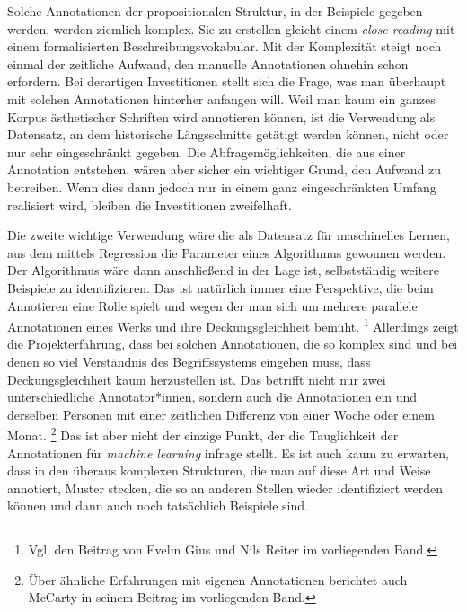 \documentclass{article}
\newcommand*{\englisch}[1]{\foreignlanguage{english}{\textit{#1}}}%
\begin{document}
Solche Annotationen der propositionalen Struktur, in der Beispiele
gegeben werden, werden ziemlich komplex. Sie zu erstellen gleicht
einem \englisch{close reading} mit einem formalisierten
Beschreibungsvokabular. Mit der Komplexität steigt noch einmal der
zeitliche Aufwand, den manuelle Annotationen ohnehin schon
erfordern. Bei derartigen Investitionen stellt sich die Frage, was man
überhaupt mit solchen Annotationen hinterher anfangen will. Weil man
kaum ein ganzes Korpus ästhetischer Schriften wird annotieren können,
ist die Verwendung als Datensatz, an dem historische Längsschnitte
getätigt werden können, nicht oder nur sehr eingeschränkt gegeben. Die
Abfragemöglichkeiten, die aus einer Annotation entstehen, wären aber
sicher ein wichtiger Grund, den Aufwand zu betreiben. Wenn dies dann
jedoch nur in einem ganz eingeschränkten Umfang realisiert wird,
bleiben die Investitionen zweifelhaft.

Die zweite wichtige Verwendung wäre die als Datensatz für maschinelles
Lernen, aus dem mittels Regression die Parameter eines Algorithmus
gewonnen werden. Der Algorithmus wäre dann anschließend in der Lage
ist, selbstständig weitere Beispiele zu identifizieren. Das ist
natürlich immer eine Perspektive, die beim Annotieren eine Rolle
spielt und wegen der man sich um mehrere parallele Annotationen eines
Werks und ihre Deckungsgleichheit bemüht.%
\footnote{Vgl. den Beitrag von Evelin Gius und Nils Reiter im
  vorliegenden Band.} %
Allerdings zeigt die Projekterfahrung, dass bei solchen Annotationen,
die so komplex sind und bei denen so viel Verständnis des
Begriffssystems eingehen muss, dass Deckungsgleichheit kaum
herzustellen ist. Das betrifft nicht nur zwei unterschiedliche
Annotator*innen, sondern auch die Annotationen ein und derselben
Personen mit einer zeitlichen Differenz von einer Woche oder einem
Monat.%
\footnote{Über ähnliche Erfahrungen mit eigenen Annotationen berichtet
  auch McCarty in seinem Beitrag im vorliegenden Band.} %
Das ist aber nicht der einzige Punkt, der die Tauglichkeit der
Annotationen für \englisch{machine learning} infrage stellt. Es ist
auch kaum zu erwarten, dass in den überaus komplexen Strukturen, die
man auf diese Art und Weise annotiert, Muster stecken, die so an
anderen Stellen wieder identifiziert werden können und dann auch noch
tatsächlich Beispiele sind.
\end{document}
